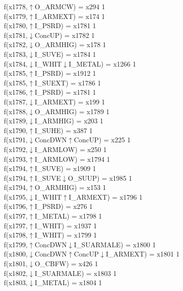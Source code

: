 f(x1778,$\uparrow$O\_ARMCW) = x294 {1} \\
f(x1779,$\uparrow$I\_ARMEXT) = x174 {1} \\
f(x1780,$\uparrow$I\_PSRD) = x1781 {1} \\
f(x1781,$\downarrow$ConcUP) = x1782 {1} \\
f(x1782,$\downarrow$O\_ARMHIG) = x178 {1} \\
f(x1783,$\downarrow$I\_SUVE) = x1784 {1} \\
f(x1784,$\downarrow$I\_WHIT$\downarrow$I\_METAL) = x1266 {1} \\
f(x1785,$\uparrow$I\_PSRD) = x1912 {1} \\
f(x1785,$\uparrow$I\_SUEXT) = x1786 {1} \\
f(x1786,$\uparrow$I\_PSRD) = x1781 {1} \\
f(x1787,$\downarrow$I\_ARMEXT) = x199 {1} \\
f(x1788,$\downarrow$O\_ARMHIG) = x1789 {1} \\
f(x1789,$\downarrow$I\_ARMHIG) = x203 {1} \\
f(x1790,$\uparrow$I\_SUHE) = x387 {1} \\
f(x1791,$\downarrow$ConcDWN$\uparrow$ConcUP) = x225 {1} \\
f(x1792,$\downarrow$I\_ARMLOW) = x250 {1} \\
f(x1793,$\uparrow$I\_ARMLOW) = x1794 {1} \\
f(x1794,$\uparrow$I\_SUVE) = x1909 {1} \\
f(x1794,$\uparrow$I\_SUVE$\downarrow$O\_SUUP) = x1985 {1} \\
f(x1794,$\uparrow$O\_ARMHIG) = x153 {1} \\
f(x1795,$\downarrow$I\_WHIT$\uparrow$I\_ARMEXT) = x1796 {1} \\
f(x1796,$\uparrow$I\_PSRD) = x276 {1} \\
f(x1797,$\uparrow$I\_METAL) = x1798 {1} \\
f(x1797,$\uparrow$I\_WHIT) = x1937 {1} \\
f(x1798,$\uparrow$I\_WHIT) = x1799 {1} \\
f(x1799,$\uparrow$ConcDWN$\downarrow$I\_SUARMALE) = x1800 {1} \\
f(x1800,$\downarrow$ConcDWN$\uparrow$ConcUP$\downarrow$I\_ARMEXT) = x1801 {1} \\
f(x1801,$\downarrow$O\_CBFW) = x426 {1} \\
f(x1802,$\downarrow$I\_SUARMALE) = x1803 {1} \\
f(x1803,$\downarrow$I\_METAL) = x1804 {1} \\
